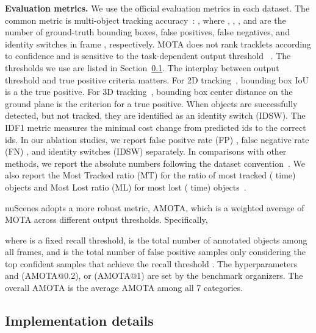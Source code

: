 \documentclass[runningheads]{llncs}
\newcommand{\lblsec}[1]{\label{sec:#1}}
\newcommand{\refsec}[1]{Section~\ref{sec:#1}}
\renewcommand{\paragraph}[1]{\noindent\textbf{#1}}
\begin{document}
\paragraph{Evaluation metrics.}
We use the official evaluation metrics in each dataset.
The common metric is multi-object tracking accuracy~\cite{stiefelhagen2006clear, leal2017tracking}:
, where , , , and  are the number of ground-truth bounding boxes, false positives, false negatives, and identity switches in frame , respectively.
MOTA does not rank tracklets according to confidence and is sensitive to the task-dependent output threshold  ~\cite{Weng2019_3dmot}.
The thresholds we use are listed in \refsec{implementation}.
The interplay between output threshold and true positive criteria matters.
For 2D tracking~\cite{MOT16, Geiger2012CVPR},  bounding box IoU is a the true positive.
For 3D tracking~\cite{nuscenes2019}, bounding box center distance  on the ground plane is the criterion for a true positive.
When objects are successfully detected, but not tracked, they are identified as an identity switch (IDSW).
The IDF1 metric measures the minimal cost change from predicted ids to the correct ids. 
In our ablation studies, we report false positve rate (FP) , false negative rate (FN) , and identity switches (IDSW)  separately.
In comparisons with other methods, we report the absolute numbers following the dataset convention~\cite{MOT16,Geiger2012CVPR}.
We also report the Most Tracked ratio (MT) for the ratio of most tracked ( time) objects and Most Lost ratio (ML) for most lost ( time) objects~\cite{stiefelhagen2006clear}.

nuScenes adopts a more robust metric, AMOTA, which is a weighted average of MOTA across different output thresholds. 
Specifically,
{
\scriptsize

}where  is a fixed recall threshold,  is the total number of annotated objects among all frames, and  is the total number of false positive samples only considering the top confident samples that achieve the recall threshold .
The hyperparameters  and  (AMOTA@0.2), or  (AMOTA@1) are set by the benchmark organizers.
The overall AMOTA is the average AMOTA among all 7 categories.

\vspace{-5mm}

\subsection{Implementation details}
\lblsec{implementation}
\end{document}

